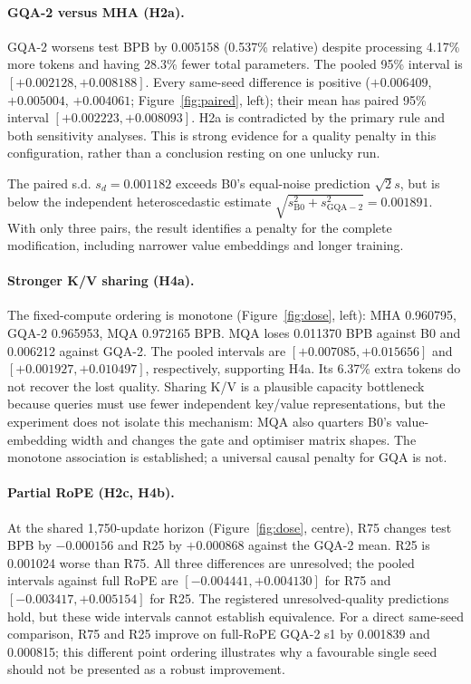 \documentclass[10pt,twocolumn]{article}
\begin{document}
\paragraph{GQA-2 versus MHA (H2a).}
GQA-2 worsens test BPB by 0.005158 (0.537\% relative) despite processing 4.17\% more tokens and having 28.3\% fewer
total parameters. The pooled 95\% interval is $[+0.002128,+0.008188]$. Every same-seed difference is positive
($+0.006409$, $+0.005004$, $+0.004061$; Figure~\ref{fig:paired}, left); their mean has paired 95\% interval $[+0.002223,+0.008093]$.
H2a is contradicted by the primary rule and both sensitivity analyses. This is strong evidence for a quality penalty
in this configuration, rather than a conclusion resting on one unlucky run.

The paired s.d. $s_d=0.001182$ exceeds B0's equal-noise prediction $\sqrt{2}s$, but is below the independent
heteroscedastic estimate $\sqrt{s_{\mathrm{B0}}^2+s_{\mathrm{GQA-2}}^2}=0.001891$. With only three pairs,
the result identifies a penalty for the complete modification, including narrower value embeddings and longer training.

\paragraph{Stronger K/V sharing (H4a).}
The fixed-compute ordering is monotone (Figure~\ref{fig:dose}, left): MHA 0.960795, GQA-2 0.965953, MQA 0.972165 BPB.
MQA loses 0.011370 BPB against B0 and 0.006212 against GQA-2. The pooled intervals are
$[+0.007085,+0.015656]$ and $[+0.001927,+0.010497]$, respectively, supporting H4a.
Its 6.37\% extra tokens do not recover the lost quality. Sharing K/V is a plausible capacity bottleneck because
queries must use fewer independent key/value representations, but the experiment does not isolate this mechanism:
MQA also quarters B0's value-embedding width and changes the gate and optimiser matrix shapes.
The monotone association is established; a universal causal penalty for GQA is not.

\paragraph{Partial RoPE (H2c, H4b).}
At the shared 1{,}750-update horizon (Figure~\ref{fig:dose}, centre), R75 changes test BPB by $-0.000156$ and R25 by $+0.000868$ against the GQA-2 mean.
R25 is 0.001024 worse than R75. All three differences are unresolved; the pooled intervals against full RoPE are
$[-0.004441,+0.004130]$ for R75 and $[-0.003417,+0.005154]$ for R25.
The registered unresolved-quality predictions hold, but these wide intervals cannot establish equivalence.
For a direct same-seed comparison, R75 and R25 improve on full-RoPE GQA-2 s1 by 0.001839 and 0.000815;
this different point ordering illustrates why a favourable single seed should not be presented as a robust improvement.
\end{document}
